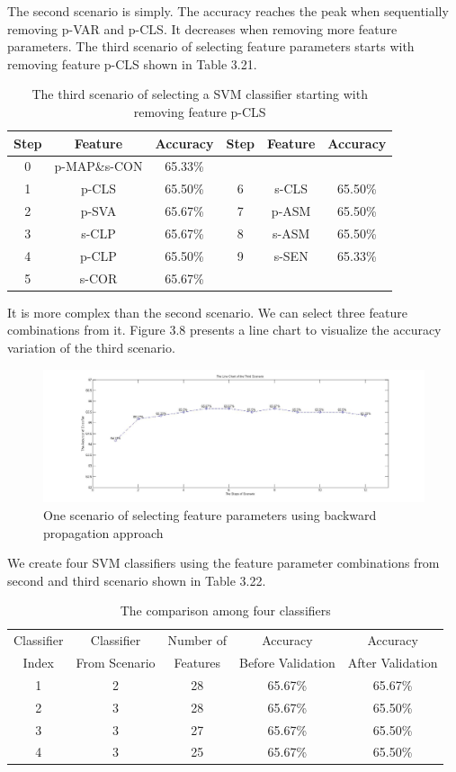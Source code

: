 The second scenario is simply. The accuracy reaches the peak when sequentially removing p-VAR and p-CLS. It decreases when removing more feature parameters. The third scenario of selecting feature parameters starts with removing feature p-CLS shown in Table 3.21. 
\begin{table}[!h]
\begin{center}
\renewcommand{\arraystretch}{0.5}
\begin{tabular}{|| c | c | c | c | c | c ||}
\hline
 Step & Feature & Accuracy & Step & Feature & Accuracy \\
\hline
 0 & p-MAP\;\&\;s-CON & 65.33\% & & & \\
\hline
 1 & p-CLS & 65.50\% & 6 & s-CLS & 65.50\% \\
 2 & p-SVA & 65.67\% & 7 & p-ASM & 65.50\% \\
 3 & s-CLP & 65.67\% & 8 & s-ASM & 65.50\% \\
 4 & p-CLP & 65.50\% & 9 & s-SEN & 65.33\% \\
 5 & s-COR & 65.67\% & & &  \\
\hline
\end{tabular}
\end{center}
\caption{The third scenario of selecting a SVM classifier starting with removing feature p-CLS}
\end{table}
It is more complex than the second scenario. We can select three feature combinations from it. Figure 3.8 presents a line chart to visualize the accuracy variation of the third scenario.
\begin{figure}
\includegraphics[width=\linewidth]{fig3_8c}
\caption{One scenario of selecting feature parameters using backward propagation approach}
\end{figure}
We create four SVM classifiers using the feature parameter combinations from second and third scenario shown in Table 3.22. 
\begin{table}[!h]
\begin{center}
\renewcommand{\arraystretch}{0.8}
\begin{tabular}{|| c | c | c | c | c ||}
\hline
 Classifier & Classifier & Number of & Accuracy & Accuracy \\
 Index & From Scenario &  Features & Before Validation & After Validation \\
\hline
 1 & 2 &28 & 65.67\% & 65.67\% \\
 2 & 3 &28 & 65.67\% & 65.50\% \\
 3 & 3 &27 & 65.67\% & 65.50\% \\
 4 & 3 &25 & 65.67\% & 65.50\% \\
\hline 
\end{tabular}
\end{center}
\caption{The comparison among four classifiers}
\end{table}
